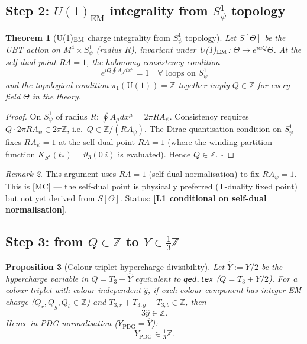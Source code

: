 \documentclass[12pt,a4paper]{article}
\newtheorem{theorem}{Theorem}[section]
\newtheorem{proposition}[theorem]{Proposition}
\theoremstyle{remark}
\newtheorem{remark}[theorem]{Remark}
\newcommand{\ZZ}{\mathbb{Z}}
\begin{document}
\subsection*{Step 2: $U(1)_{\mathrm{EM}}$ integrality from $S^1_\psi$ topology}
\begin{theorem}[U(1)$_{\rm EM}$ charge integrality from $S^1_\psi$ topology]
\label{thm:Q-integrality}
Let $S[\Theta]$ be the UBT action on $M^4\times S^1_\psi$ (radius $R$),
invariant under U(1)$_{\rm EM}$: $\Theta\to e^{i\alpha Q}\Theta$.
At the self-dual point $R\Lambda=1$, the holonomy consistency condition
\[
  e^{iQ\oint A_\mu dx^\mu} = 1
  \quad\forall\text{ loops on }S^1_\psi
\]
and the topological condition $\pi_1(\mathrm{U}(1))=\mathbb{Z}$
together imply $Q\in\mathbb{Z}$ for every field $\Theta$ in the theory.
\end{theorem}

\begin{proof}
On $S^1_\psi$ of radius $R$: $\oint A_\mu dx^\mu = 2\pi R A_\psi$.
Consistency requires $Q\cdot 2\pi R A_\psi \in 2\pi\mathbb{Z}$,
i.e.\ $Q \in \mathbb{Z}/(R A_\psi)$.
The Dirac quantisation condition on $S^1_\psi$ fixes $R A_\psi = 1$
at the self-dual point $R\Lambda=1$ (where the winding partition function
$K_{S^1}(t_*)=\vartheta_3(0|i)$ is evaluated).
Hence $Q\in\mathbb{Z}$. $\square$
\end{proof}

\begin{remark}
This argument uses $R\Lambda=1$ (self-dual normalisation) to fix
$RA_\psi=1$. This is [MC] — the self-dual point is physically
preferred (T-duality fixed point) but not yet derived from $S[\Theta]$.
Status: \textbf{[L1 conditional on self-dual normalisation]}.
\end{remark}


\subsection*{Step 3: from $Q\in\ZZ$ to $Y\in\frac13\ZZ$}
\begin{proposition}[Colour-triplet hypercharge divisibility]
\label{prop:triplet_sum}
Let \(\widehat Y:=Y/2\) be the hypercharge variable in
\(
Q=T_3+\widehat Y
\)
equivalent to \texttt{qed.tex} (\(Q=T_3+Y/2\)).
For a colour triplet with colour-independent \(\widehat y\), if each colour component has integer EM charge
(\(Q_r,Q_g,Q_b\in\ZZ\)) and \(T_{3,r}+T_{3,g}+T_{3,b}\in\ZZ\), then
\[
3\widehat y\in\ZZ.
\]
Hence in PDG normalisation (\(Y_{\mathrm{PDG}}=\widehat Y\)):
\[
Y_{\mathrm{PDG}}\in\tfrac13\ZZ.
\]
\end{proposition}
\end{document}
